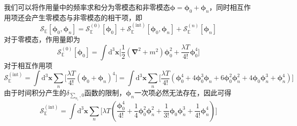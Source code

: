 我们可以将作用量中的频率求和分为零模态和非零模态$\boldsymbol{\phi}=\boldsymbol{\phi}_0+\boldsymbol{\phi}_n$，同时相互作用项还会产生零模态与非零模态的相干项，即
\begin{equation}
    {\mathcal{S}_\mathbb{E}}[\boldsymbol{\phi}_0,\boldsymbol{\phi}_n] = {\mathcal{S}^{(0)}_\mathbb{E}}[\boldsymbol{\phi}_0]  + {\mathcal{S}^{(\mathrm{int})}_\mathbb{E}}[\boldsymbol{\phi}_0,\boldsymbol{\phi}_n]+ {\mathcal{S}^{(n)}_\mathbb{E}}[\boldsymbol{\phi}_n]
\end{equation}
对于零模态，作用量即为
\begin{equation}
    {\mathcal{S}^{(0)}_\mathbb{E}} [\boldsymbol{\phi}_0] = \int\mathrm{d}^3 \boldsymbol{x} \Big[\frac{1}{2} (\boldsymbol{\nabla}^2 + m^2)\boldsymbol{\phi}_0^2 + \frac{\lambda T}{4!} \boldsymbol{\phi}^4_0\Big]
\end{equation}
对于相互作用项
\begin{equation}
    {\mathcal{S}^{(\mathrm{int})}_\mathbb{E}}  = \int\mathrm{d}^3 \boldsymbol{x} \sum_n\Big[ \frac{\lambda T}{4!} (\boldsymbol{\phi}_0+\boldsymbol{\phi}_n)^4\Big] = \int\mathrm{d}^3 \boldsymbol{x} \sum_n\Big[ \frac{\lambda T}{4!} (\boldsymbol{\phi}_0^4 + 4 \boldsymbol{\phi}_0^3\boldsymbol{\phi}_n + 6\boldsymbol{\phi}_0^2 \boldsymbol{\phi}_n^2 + 4\boldsymbol{\phi}_0 \boldsymbol{\phi}_n^3 +\boldsymbol{\phi}_n^4)\Big]
\end{equation}
由于时间积分产生的$\delta_{\sum_{n_i},0}$函数的限制，$ \boldsymbol{\phi}_n$一次项必然无法存在，因此可得
\begin{equation}
    {\mathcal{S}^{(\mathrm{int})}_\mathbb{E}}  = \int\mathrm{d}^3 \boldsymbol{x} \sum_n\Big[ \lambda T (\frac{\boldsymbol{\phi}_0^4}{4!}  + \frac{1}{4}\boldsymbol{\phi}_0^2 \boldsymbol{\phi}_n^2 + \frac{1}{3!}\boldsymbol{\phi}_0 \boldsymbol{\phi}_n^3 +\frac{1}{4!}\boldsymbol{\phi}_n^4)\Big]
\end{equation}

